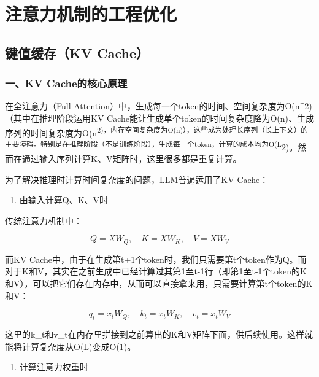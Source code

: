 \hypertarget{ux6ce8ux610fux529bux673aux5236ux7684ux5de5ux7a0bux4f18ux5316}{%
\chapter{注意力机制的工程优化}\label{ux6ce8ux610fux529bux673aux5236ux7684ux5de5ux7a0bux4f18ux5316}}

\hypertarget{ux952eux503cux7f13ux5b58kv-cache}{%
\section{键值缓存（KV Cache）}\label{ux952eux503cux7f13ux5b58kv-cache}}

\hypertarget{ux4e00kv-cacheux7684ux6838ux5fc3ux539fux7406}{%
\subsection{一、KV Cache的核心原理}\label{ux4e00kv-cacheux7684ux6838ux5fc3ux539fux7406}}

在全注意力（Full Attention）中，生成每一个token的时间、空间复杂度为O(n\^{}2)（其中在推理阶段运用KV Cache能让生成单个token的时间复杂度降为O(n)、生成序列的时间复杂度为O(n\textsuperscript{2)，内存空间复杂度为O(n)），这些成为处理长序列（长上下文）的主要障碍。特别是在推理阶段（不是训练阶段），生成每一个token，计算的成本均为O(L}2)。然而在通过输入序列计算K、V矩阵时，这里很多都是重复计算。

为了解决推理时计算时间复杂度的问题，LLM普遍运用了KV Cache：

\begin{enumerate}
\def\labelenumi{\arabic{enumi}.}
\tightlist
\item
  由输入计算Q、K、V时
\end{enumerate}

传统注意力机制中：

\[
Q = XW_Q,\quad K = XW_K,\quad V = XW_V
\]

而KV Cache中，由于在生成第t+1个token时，我们只需要第t个token作为Q。而对于K和V，其实在之前生成中已经计算过其第1至t-1行（即第1至t-1个token的K和V），可以把它们存在内存中，从而可以直接拿来用，只需要计算第t个token的K和V：

\[
q_t = x_tW_Q,\quad k_t = x_tW_K,\quad v_t = x_tW_V
\]

这里的k\_t和v\_t在内存里拼接到之前算出的K和V矩阵下面，供后续使用。这样就能将计算复杂度从O(L)变成O(1)。

\begin{enumerate}
\def\labelenumi{\arabic{enumi}.}
\setcounter{enumi}{1}
\tightlist
\item
  计算注意力权重时
\end{enumerate}

